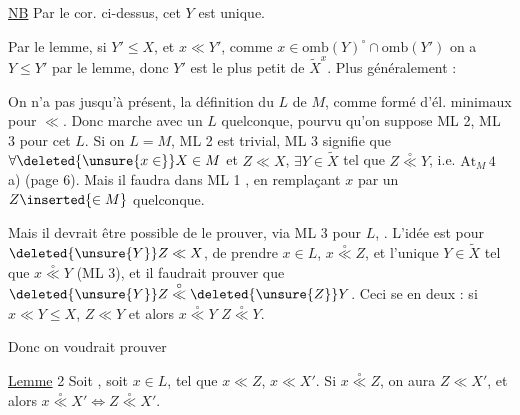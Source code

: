 
\uline{NB} Par le cor. ci-dessus, cet $Y$ est unique.

Par le lemme, si  $Y'\leq X$, et $x\ll Y'$, comme $x\in\mathrm{omb}(Y)^\circ\cap\mathrm{omb}(Y')$  on a $Y\leq Y'$ par le lemme, donc $Y'$ est le plus petit  de $\widetilde X^x$. Plus généralement :


On n'a pas jusqu'à présent,  la définition du  $L$ de $M$, comme formé d'él. minimaux pour $\ll$. Donc  marche avec un $L$ quelconque, pourvu qu'on suppose ML 2, ML 3 pour cet $L$. Si on  $L=M$, ML 2 est trivial, ML 3 signifie que $\forall\deleted{\unsure{x\in}}X\in M$ et $Z\ll X$, $\exists Y\in\widetilde X$ tel que $Z\overset{\circ}{\ll}Y$, i.e. $\mathrm{At}_{M}\,4$ a) (page 6). Mais il faudra dans ML 1  , en remplaçant $x$ par un $Z\inserted{\in M}$ quelconque.

Mais il devrait être possible de le prouver, via ML 3  pour $L$, . L'idée est pour $\deleted{\unsure{Y}}Z\ll X$, de prendre $x\in L$, $x\overset{\circ}{\ll}Z$,  et l'unique $Y\in\widetilde X$ tel que $x\overset{\circ}{\ll}Y$ (ML 3), et il  faudrait prouver que $\deleted{\unsure{Y}}Z\overset{\circ}{\ll}\deleted{\unsure{Z}}Y$. Ceci se  en deux : si $x\ll Y\leq X$,  $Z\ll Y$ et alors $x\overset{\circ}{\ll}Y$  $Z\overset{\circ}{\ll}Y$.

Donc on voudrait prouver

\uline{Lemme} 2 Soit
, soit $x\in L$, tel que $x\ll Z$,  $x\ll X'$. Si $x\overset{\circ}{\ll}Z$, on aura $Z\ll X'$, et alors $x\overset{\circ}{\ll}X'\Longleftrightarrow Z\overset{\circ}{\ll}X'$.

